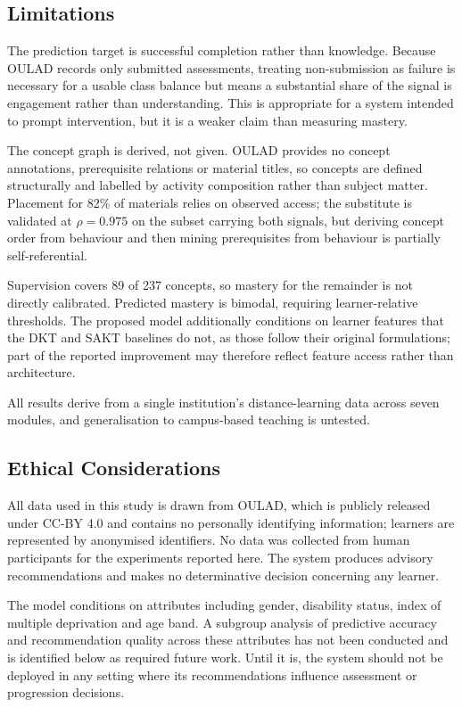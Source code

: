 \documentclass[conference]{IEEEtran}
\begin{document}
\subsection{Limitations}

The prediction target is successful completion rather than knowledge. Because OULAD
records only submitted assessments, treating non-submission as failure is necessary for
a usable class balance but means a substantial share of the signal is engagement rather
than understanding. This is appropriate for a system intended to prompt intervention,
but it is a weaker claim than measuring mastery.

The concept graph is derived, not given. OULAD provides no concept annotations,
prerequisite relations or material titles, so concepts are defined structurally and
labelled by activity composition rather than subject matter. Placement for 82\% of
materials relies on observed access; the substitute is validated at $\rho = 0.975$ on the
subset carrying both signals, but deriving concept order from behaviour and then mining
prerequisites from behaviour is partially self-referential.

Supervision covers 89 of 237 concepts, so mastery for the remainder is not directly
calibrated. Predicted mastery is bimodal, requiring learner-relative thresholds. The
proposed model additionally conditions on learner features that the DKT and SAKT
baselines do not, as those follow their original formulations; part of the reported
improvement may therefore reflect feature access rather than architecture.

All results derive from a single institution's distance-learning data across seven
modules, and generalisation to campus-based teaching is untested.

\subsection{Ethical Considerations}

All data used in this study is drawn from OULAD, which is publicly released under
CC-BY 4.0 and contains no personally identifying information; learners are represented by
anonymised identifiers. No data was collected from human participants for the experiments
reported here. The system produces advisory recommendations and makes no determinative
decision concerning any learner.

The model conditions on attributes including gender, disability status, index of multiple
deprivation and age band. A subgroup analysis of predictive accuracy and recommendation
quality across these attributes has not been conducted and is identified below as
required future work. Until it is, the system should not be deployed in any setting where
its recommendations influence assessment or progression decisions.
\end{document}

